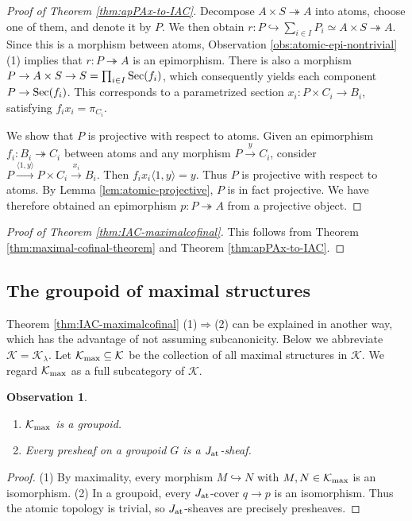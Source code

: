 \documentclass[10pt]{amsart}
\numberwithin{equation}{section}
\theoremstyle{plain}
\newtheorem{obs}[theorem]{Observation}
\theoremstyle{definition}
\newcommand{\K}{\mathcal{K}}
\newcommand{\pair}[1]{\langle #1 \rangle}
\newcommand{\surj}{\twoheadrightarrow}
\newcommand{\embed}{\hookrightarrow}
\newcommand{\edge}[1]{\overset{#1}{\longrightarrow}}
\newcommand{\xedge}[1]{\xrightarrow{#1}}
\begin{document}
\begin{proof}[Proof of Theorem \ref{thm:apPAx-to-IAC}]
Decompose $A\times S\surj A$ into atoms, choose one of them, and denote it by $P$.
We then obtain $r\colon P\embed\sum_{i\in I}P_i\simeq A\times S\surj A$.
Since this is a morphism between atoms, Observation \ref{obs:atomic-epi-nontrivial} (1) implies that $r\colon P\surj A$ is an epimorphism.
There is also a morphism $P\to A\times S\to S=\prod_{i\in I}{\rm Sec}(f_i)$, which consequently yields each component $P\to {\rm Sec}(f_i)$.
This corresponds to a parametrized section $x_i\colon P\times C_i\to B_i$, satisfying $f_ix_i=\pi_{C_i}$.

We show that $P$ is projective with respect to atoms.
Given an epimorphism $f_i\colon B_i\surj C_i$ between atoms and any morphism $P\edge{y} C_i$, consider $P\xedge{\pair{1,y}}P\times C_i\edge{x_i}B_i$. Then $f_ix_i\pair{1,y}=y$.
Thus $P$ is projective with respect to atoms.
By Lemma \ref{lem:atomic-projective}, $P$ is in fact projective.
We have therefore obtained an epimorphism $p\colon P\surj A$ from a projective object.
\end{proof}

\begin{proof}[Proof of Theorem \ref{thm:IAC-maximalcofinal}]
This follows from Theorem \ref{thm:maximal-cofinal-theorem} and Theorem \ref{thm:apPAx-to-IAC}.
\end{proof}

\subsection{The groupoid of maximal structures}\label{sec:groupoid}

Theorem \ref{thm:IAC-maximalcofinal} (1)$\Rightarrow$(2) can be explained in another way, which has the advantage of not assuming subcanonicity.
Below we abbreviate $\K=\K_\lambda$.
Let $\mathcal{K}_{\rm max}\subseteq\mathcal{K}$ be the collection of all maximal structures in $\mathcal{K}$.
We regard $\mathcal{K}_{\rm max}$ as a full subcategory of $\K$.



\begin{obs}\label{obs:groupoid-topology}~
\begin{enumerate}
\item $\mathcal{K}_{\rm max}$ is a groupoid.
\item Every presheaf on a groupoid $G$ is a $J_{\rm at}$-sheaf.
\end{enumerate}
\end{obs}

\begin{proof}
(1)
By maximality, every morphism $M\embed N$ with $M,N\in\mathcal{K}_{\rm max}$ is an isomorphism.
(2)
In a groupoid, every $J_{\rm at}$-cover $q\to p$ is an isomorphism. Thus the atomic topology is trivial, so $J_{\rm at}$-sheaves are precisely presheaves.
\end{proof}
\end{document}

